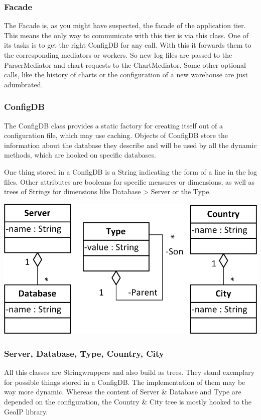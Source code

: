 \subsubsection*{Facade}
The Facade is, as you might have suspected, the facade of the application tier. 
This means the only way to communicate with this tier is via this class.
One of its tasks is to get the right ConfigDB for any call. With this it forwards
them to the corresponding mediators or workers. So new log files are passed to
the ParserMediator and chart requests to the ChartMediator. Some other optional
calls, like the history of charts or the configuration of a new warehouse are just
adumbrated. %


\subsubsection*{ConfigDB}
The ConfigDB class provides a static factory for creating itself out of a configuration
file, which may use caching. Objects of ConfigDB store the information about the database
they describe and will be used by all the dynamic methods, which are hooked on specific
databases. 

One thing stored in a ConfigDB is a String indicating the form of a line in the log files.
Other attributes are booleans for specific measures or dimensions, as well as trees of
Strings for dimensions like Database > Server or the Type.

\newpage
\begin{center}
\includegraphics{Pictures/Parts/Strings.png}
\end{center}  
\subsubsection*{Server, Database, Type, Country, City}
All this classes are Stringwrappers and also build as trees. They stand exemplary for
possible things stored in a ConfigDB. The implementation of them may be way more dynamic.
Whereas the content of Server \& Database and Type are depended on the configuration,
the Country \& City tree is mostly hooked to the GeoIP library.


